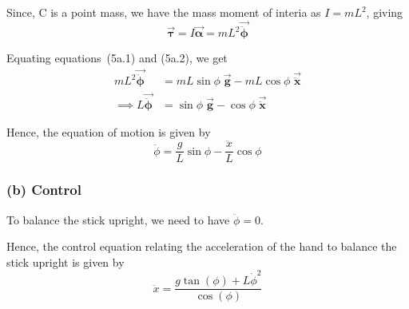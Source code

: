 Since, C is a point mass, we have the mass moment of interia as \( I = mL^2 \), giving
\begin{equation}
    \vec{\boldsymbol{\tau}} = I \vec{\boldsymbol{\alpha}} = mL^2 \vec{\ddot{\boldsymbol{\phi}}}
    \tag{5a.2}
\end{equation}

Equating equations~(5a.1) and (5a.2), we get
\begin{align*}
    mL^2 \vec{\ddot{\boldsymbol{\phi}}}
     & =
    mL\sin\phi \; \vec{\mathbf{g}} - mL\cos\phi \; \vec{\ddot{\mathbf{x}}} \\
    \implies
    L \vec{\ddot{\boldsymbol{\phi}}}
     & =
    \sin\phi \; \vec{\mathbf{g}} - \cos\phi \; \vec{\ddot{\mathbf{x}}}
\end{align*}

Hence, the equation of motion is given by
\begin{equation}
    \boxed{
        \ddot{\phi} = \frac{g}{L} \sin\phi - \frac{\ddot x}{L} \cos\phi
    }
    \tag{5a.3}
\end{equation}

\subsubsection*{(b) Control}

To balance the stick upright, we need to have \( \ddot\phi = 0 \).

Hence, the control equation relating the acceleration of the hand to balance the stick upright is given by
\begin{equation}
    \boxed{
        \ddot x = \frac{g \tan(\phi) + L \dot{\phi}^2}{\cos(\phi)}
    }
    \tag{5b.1}
\end{equation}
